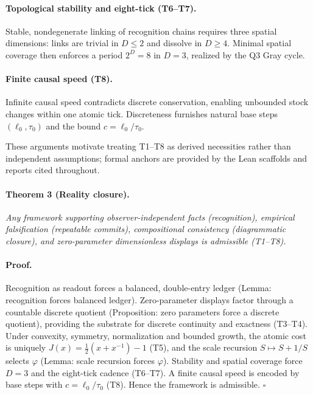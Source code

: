 \documentclass[11pt]{article}
\begin{document}
\paragraph{Topological stability and eight\mbox{-}tick (T6--T7).} Stable, nondegenerate linking of recognition chains requires three spatial dimensions: links are trivial in \(D\le 2\) and dissolve in \(D\ge 4\). Minimal spatial coverage then enforces a period \(2^D=8\) in \(D=3\), realized by the Q3 Gray cycle.

\paragraph{Finite causal speed (T8).} Infinite causal speed contradicts discrete conservation, enabling unbounded stock changes within one atomic tick. Discreteness furnishes natural base steps \((\ell_0,\tau_0)\) and the bound \(c=\ell_0/\tau_0\).

These arguments motivate treating T1--T8 as derived necessities rather than independent assumptions; formal anchors are provided by the Lean scaffolds and reports cited throughout.

\paragraph{Theorem 3 (Reality closure).} \emph{Any framework supporting observer\mbox{-}independent facts (recognition), empirical falsification (repeatable commits), compositional consistency (diagrammatic closure), and zero\mbox{-}parameter dimensionless displays is admissible (T1--T8).}

\paragraph{Proof.} Recognition as readout forces a balanced, double\mbox{-}entry ledger (Lemma: recognition forces balanced ledger). Zero\mbox{-}parameter displays factor through a countable discrete quotient (Proposition: zero parameters force a discrete quotient), providing the substrate for discrete continuity and exactness (T3--T4). Under convexity, symmetry, normalization and bounded growth, the atomic cost is uniquely \(J(x)=\tfrac12(x+x^{-1})-1\) (T5), and the scale recursion \(S\mapsto S+1/S\) selects \(\varphi\) (Lemma: scale recursion forces \(\varphi\)). Stability and spatial coverage force \(D=3\) and the eight\mbox{-}tick cadence (T6--T7). A finite causal speed is encoded by base steps with \(c=\ell_0/\tau_0\) (T8). Hence the framework is admissible. \hfill$\square$
\end{document}
